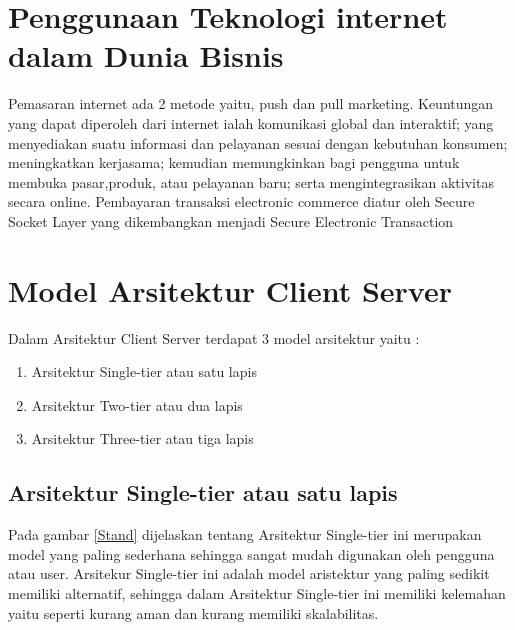 \section{Penggunaan Teknologi internet dalam Dunia Bisnis}
Pemasaran internet ada 2 metode yaitu, push dan pull marketing. Keuntungan yang dapat diperoleh dari internet ialah komunikasi 
global dan interaktif; yang menyediakan suatu informasi dan pelayanan sesuai dengan kebutuhan konsumen; meningkatkan kerjasama; 
kemudian memungkinkan bagi pengguna untuk membuka pasar,produk, atau pelayanan baru; serta mengintegrasikan aktivitas secara online. 
Pembayaran transaksi electronic commerce diatur oleh Secure Socket Layer yang dikembangkan menjadi Secure Electronic Transaction

\section{Model Arsitektur Client Server}
Dalam Arsitektur Client Server terdapat 3 model arsitektur yaitu :

\begin{enumerate}
	\item Arsitektur Single-tier atau satu lapis
	\item Arsitektur Two-tier atau dua lapis
	\item Arsitektur Three-tier atau tiga lapis
\end{enumerate}

\subsection{Arsitektur Single-tier atau satu lapis}
Pada gambar \ref{Stand} dijelaskan tentang Arsitektur Single-tier ini merupakan model yang paling sederhana sehingga sangat mudah digunakan oleh pengguna atau user.
Arsitekur Single-tier ini adalah model aristektur yang paling sedikit memiliki alternatif, sehingga dalam Arsitektur Single-tier ini
memiliki kelemahan yaitu seperti kurang aman dan kurang memiliki skalabilitas.

